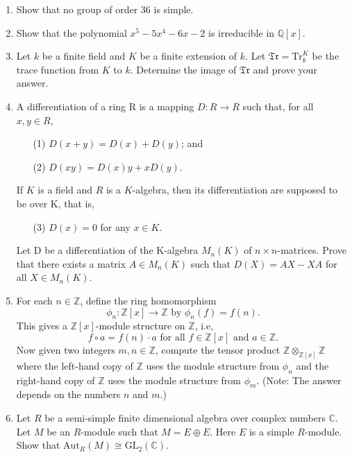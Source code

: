 \documentclass{article}
\begin{document}
\begin{enumerate}
    \item Show that no group of order 36 is simple.

    \item Show that the polynomial \(x^5 - 5x^4 - 6x - 2\) is irreducible in \(\mathbb{Q}[x]\).

    \item Let \(k\) be a finite field and \(K\) be a finite extension of \(k\). Let \(\mathfrak{Tr} = \text{Tr}_k^K\) be the trace function from \(K\) to \(k\). Determine the image of \(\mathfrak{Tr}\) and prove your answer.

    \item A differentiation of a ring R is a mapping \(D:R\to R\) such that, for all \(x,y\in R\),
    \begin{itemize}
        \item[(1)] \(D(x+y) = D(x) + D(y)\); and
        \item[(2)] \(D(xy) = D(x)y + xD(y)\).
    \end{itemize}
    If \(K\) is a field and \(R\) is a \(K\)-algebra, then its differentiation are supposed to be over K, that is,
    \begin{itemize}
        \item[(3)] \(D(x) = 0\) for any \(x \in K\).
    \end{itemize}
    Let D be a differentiation of the K-algebra \(M_n(K)\) of \(n \times n\)-matrices. Prove that there exists a matrix \(A \in M_n(K)\) such that \(D(X) = AX - XA\) for all \(X \in M_n(K)\).

    \item For each \(n \in \mathbb{Z}\), define the ring homomorphism
    \[\phi_n : \mathbb{Z}[x] \to \mathbb{Z} \text{ by } \phi_n(f) = f(n).\]
    This gives a \(\mathbb{Z}[x]\)-module structure on \(\mathbb{Z}\), i.e,
    \[f \circ a = f(n) \cdot a \text{ for all } f \in \mathbb{Z}[x] \text{ and } a \in \mathbb{Z}.\]
    Now given two integers \(m,n \in \mathbb{Z}\), compute the tensor product \(\mathbb{Z} \otimes_{\mathbb{Z}[x]} \mathbb{Z}\) where the left-hand copy of \(\mathbb{Z}\) uses the module structure from \(\phi_n\) and the right-hand copy of \(\mathbb{Z}\) uses the module structure from \(\phi_m\). (Note: The answer depends on the numbers \(n\) and \(m\).)

    \item Let \(R\) be a semi-simple finite dimensional algebra over complex numbers \(\mathbb{C}\). Let \(M\) be an \(R\)-module such that \(M = E \oplus E\). Here \(E\) is a simple \(R\)-module. Show that \(\text{Aut}_R(M) \cong \text{GL}_2(\mathbb{C})\).
\end{enumerate}
\end{document}
